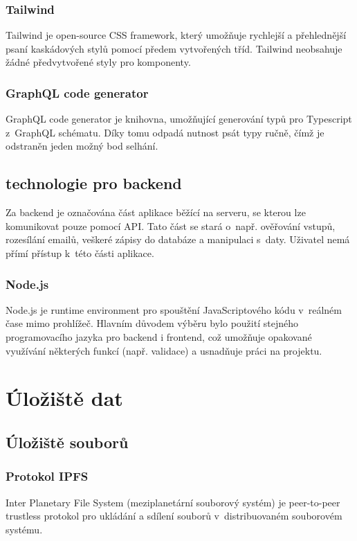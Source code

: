 \documentclass[12pt, a4paper,
  oneside,      %
]{report}
\begin{document}
    \subsection{Tailwind}
    Tailwind je open-source CSS framework, který umožňuje rychlejší a přehlednější psaní kaskádových stylů pomocí předem vytvořených tříd. Tailwind neobsahuje žádné předvytvořené styly pro komponenty. \cite{tailwindDocumentation}
    
    \subsection{GraphQL code generator}
    GraphQL code generator je knihovna, umožňující generování typů pro Typescript z~GraphQL schématu. Díky tomu odpadá nutnost psát typy ručně, čímž je odstraněn jeden možný bod selhání. \cite{graphqlCodeGeneratorDocs}

\section{technologie pro backend}
Za backend je označována část aplikace běžící na serveru, se kterou lze komunikovat pouze pomocí API. Tato část se stará o~např. ověřování vstupů, rozesílání emailů, veškeré zápisy do databáze a manipulaci s~daty. Uživatel nemá přímí přístup k~této části aplikace. \cite{whatIsFrontend} %

    \subsection{Node.js}
    Node.js je runtime environment pro spouštění JavaScriptového kódu v~reálném čase mimo prohlížeč. Hlavním důvodem výběru bylo použití stejného programovacího jazyka pro backend i frontend, což umožňuje opakované využívání některých funkcí (např. validace) a usnadňuje práci na projektu. \cite{aboutNodeJS}

\chapter{Úložiště dat}
\section{Úložiště souborů}
\subsection{Protokol IPFS}\label{subsection:IPFS}
Inter Planetary File System (meziplanetární souborový systém) je peer-to-peer trustless protokol pro ukládání a sdílení souborů v~distribuovaném souborovém systému. \cite{IPFSDocs}
\end{document}
